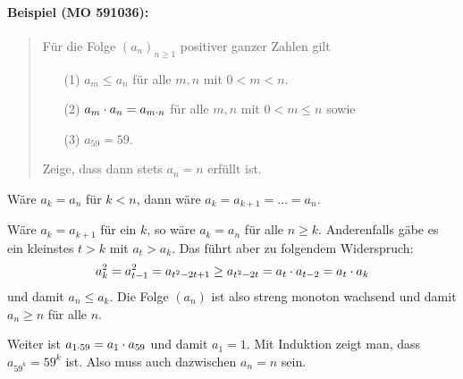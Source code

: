 \documentclass[11pt,a4paper]{article}
\begin{document}
\paragraph{Beispiel (MO 591036):}
\begin{quote}
  Für die Folge $(a_n)_{n\ge 1}$ positiver ganzer Zahlen gilt 
  \begin{itemize}
  \item[(1)] $a_m\le a_n$ für alle $m,n$ mit $0<m<n$.
  \item[(2)] $a_m\cdot a_n=a_{m\cdot n}$ für alle $m,n$ mit $0<m\le n$ sowie
  \item[(3)] $a_{59}=59$.
  \end{itemize}
  Zeige, dass dann stets $a_n=n$ erfüllt ist.
\end{quote}
\begin{loesung}
  Wäre $a_k=a_n$ für $k<n$, dann wäre $a_k=a_{k+1}=\dots=a_n$.

  Wäre $a_k=a_{k+1}$ für ein $k$, so wäre $a_k=a_n$ für alle $n\ge k$.
  Anderenfalls gäbe es ein kleinstes $t>k$ mit $a_t>a_k$. Das führt aber zu
  folgendem Widerspruch:
  \begin{gather*}
    a_k^2=a_{t-1}^2=a_{t^2-2t+1}\ge a_{t^2-2t}=a_t\cdot a_{t-2}=a_t\cdot a_k
  \end{gather*}
  und damit $a_n\le a_k$.  Die Folge $(a_n)$ ist also streng monoton
  wachsend und damit $a_n\ge n$ für alle $n$. 

  Weiter ist $a_{1\cdot 59}=a_1\cdot a_{59}$ und damit $a_1=1$. Mit Induktion zeigt
  man, dass $a_{59^k}=59^k$ ist. Also muss auch dazwischen $a_n=n$ sein.
\end{loesung}
\end{document}
